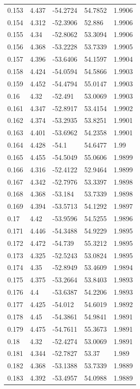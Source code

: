 \begin{tabular}{lllll}
0.153 & 4.437 & -54.2724 & 54.7852 & 1.9906 \\
0.154 & 4.312 & -52.3906 & 52.886 & 1.9906 \\
0.155 & 4.34 & -52.8062 & 53.3094 & 1.9906 \\
0.156 & 4.368 & -53.2228 & 53.7339 & 1.9905 \\
0.157 & 4.396 & -53.6406 & 54.1597 & 1.9904 \\
0.158 & 4.424 & -54.0594 & 54.5866 & 1.9903 \\
0.159 & 4.452 & -54.4794 & 55.0147 & 1.9903 \\
0.16 & 4.32 & -52.491 & 53.0069 & 1.9903 \\
0.161 & 4.347 & -52.8917 & 53.4154 & 1.9902 \\
0.162 & 4.374 & -53.2935 & 53.8251 & 1.9901 \\
0.163 & 4.401 & -53.6962 & 54.2358 & 1.9901 \\
0.164 & 4.428 & -54.1 & 54.6477 & 1.99 \\
0.165 & 4.455 & -54.5049 & 55.0606 & 1.9899 \\
0.166 & 4.316 & -52.4122 & 52.9464 & 1.9899 \\
0.167 & 4.342 & -52.7976 & 53.3397 & 1.9898 \\
0.168 & 4.368 & -53.184 & 53.7339 & 1.9898 \\
0.169 & 4.394 & -53.5713 & 54.1292 & 1.9897 \\
0.17 & 4.42 & -53.9596 & 54.5255 & 1.9896 \\
0.171 & 4.446 & -54.3488 & 54.9229 & 1.9895 \\
0.172 & 4.472 & -54.739 & 55.3212 & 1.9895 \\
0.173 & 4.325 & -52.5243 & 53.0824 & 1.9895 \\
0.174 & 4.35 & -52.8949 & 53.4609 & 1.9894 \\
0.175 & 4.375 & -53.2664 & 53.8403 & 1.9893 \\
0.176 & 4.4 & -53.6387 & 54.2206 & 1.9893 \\
0.177 & 4.425 & -54.012 & 54.6019 & 1.9892 \\
0.178 & 4.45 & -54.3861 & 54.9841 & 1.9891 \\
0.179 & 4.475 & -54.7611 & 55.3673 & 1.9891 \\
0.18 & 4.32 & -52.4274 & 53.0069 & 1.9891 \\
0.181 & 4.344 & -52.7827 & 53.37 & 1.989 \\
0.182 & 4.368 & -53.1388 & 53.7339 & 1.9889 \\
0.183 & 4.392 & -53.4957 & 54.0988 & 1.9889 \\

\end{tabular}
